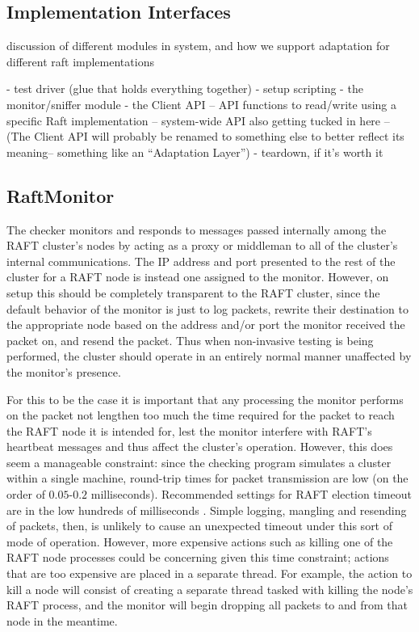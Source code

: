 \documentclass[UTF8]{article}
\begin{document}
\subsection{Implementation Interfaces}

discussion of different modules in system, and how we support adaptation for different raft implementations

- test driver (glue that holds everything together)
- setup scripting
- the monitor/sniffer module
- the Client API
-- API functions to read/write using a specific Raft implementation
-- system-wide API also getting tucked in here
-- (The Client API will probably be renamed to something else to better reflect its meaning-- something like an ``Adaptation Layer'')
- teardown, if it's worth it

\subsection{RaftMonitor}

The checker monitors and responds to messages passed internally among the RAFT cluster's nodes by acting as a proxy or middleman to all of the cluster's internal communications. The IP address and port presented to the rest of the cluster for a RAFT node is instead one assigned to the monitor. However, on setup this should be completely transparent to the RAFT cluster, since the default behavior of the monitor is just to log packets, rewrite their destination to the appropriate node based on the address and/or port the monitor received the packet on, and resend the packet. Thus when non-invasive testing is being performed, the cluster should operate in an entirely normal manner unaffected by the monitor's presence.

For this to be the case it is important that any processing the monitor performs on the packet not lengthen too much the time required for the packet to reach the RAFT node it is intended for, lest the monitor interfere with RAFT's heartbeat messages and thus affect the cluster's operation. However, this does seem a manageable constraint: since the checking program simulates a cluster within a single machine, round-trip times for packet transmission are low (on the order of $0.05$-$0.2$ milliseconds). Recommended settings for RAFT election timeout are in the low hundreds of milliseconds \cite{raftPaper}. Simple logging, mangling and resending of packets, then, is unlikely to cause an unexpected timeout under this sort of mode of operation. However, more expensive actions such as killing one of the RAFT node processes could be concerning given this time constraint; actions that are too expensive are placed in a separate thread. For example, the action to kill a node will consist of creating a separate thread tasked with killing the node's RAFT process, and the monitor will begin dropping all packets to and from that node in the meantime.
\end{document}

